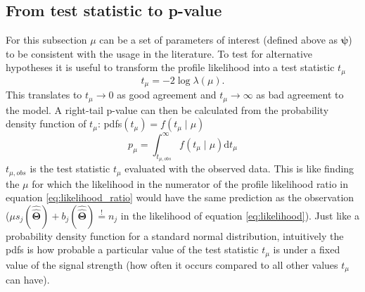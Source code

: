 \subsection{From test statistic to p-value}
For this subsection $\mu$ can be a set of parameters of interest (defined above as $\bm{\psi}$) to be consistent with the usage in the literature. To test for alternative hypotheses it is useful to transform the profile likelihood into a test statistic $t_{\mu}$ 
\begin{equation}
    t_{\mu}=-2\log \lambda(\mu).
\end{equation}
This translates to $t_{\mu} \rightarrow 0$ as good agreement and $t_{\mu} \rightarrow \infty$ as bad agreement to the model. A right-tail p-value can then be calculated from the probability density function of $t_\mu$: \acp{pdf}$(t_\mu) = f(t_\mu \mid \mu)$
\begin{equation}\label{eq:p-value}
    p_\mu = \int_{t_{\mu ,obs}}^{\infty} 
    f(t_\mu \mid \mu) \mathrm{d}t_\mu
\end{equation}
$t_{\mu ,obs}$ is the test statistic $t_\mu$ evaluated with the observed data. This is like finding the $\mu$ for which the likelihood in the numerator of the profile likelihood ratio in equation \ref{eq:likelihood_ratio} would have the same prediction as the observation ($\mu s_j(\hat{\hat{\bm{\Theta}}}) + b_j(\hat{\hat{\bm{\Theta}}})\stackrel{!}{=}n_j$ in the likelihood of equation \ref{eq:likelihood}). Just like a probability density function for a standard normal distribution, intuitively the \acp{pdf} is how probable a particular value of the test statistic $t_\mu$ is under a fixed value of the signal strength (how often it occurs compared to all other values $t_\mu$ can have). 

